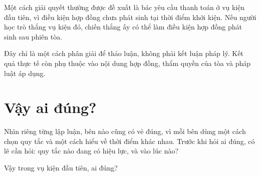 Một cách giải quyết thường được đề xuất là bác yêu cầu thanh toán ở vụ kiện đầu tiên, vì điều kiện hợp đồng chưa phát sinh tại thời điểm khởi kiện. Nếu người học trò thắng vụ kiện đó, chiến thắng ấy có thể làm điều kiện hợp đồng phát sinh sau phiên tòa.

Đây chỉ là một cách phân giải để thảo luận, không phải kết luận pháp lý. Kết quả thực tế còn phụ thuộc vào nội dung hợp đồng, thẩm quyền của tòa và pháp luật áp dụng.

\section*{Vậy ai đúng?}

Nhìn riêng từng lập luận, bên nào cũng có vẻ đúng, vì mỗi bên dùng một cách chọn quy tắc và một cách hiểu về thời điểm khác nhau. Trước khi hỏi ai đúng, có lẽ cần hỏi: quy tắc nào đang có hiệu lực, và vào lúc nào?

Vậy trong vụ kiện đầu tiên, ai đúng?

